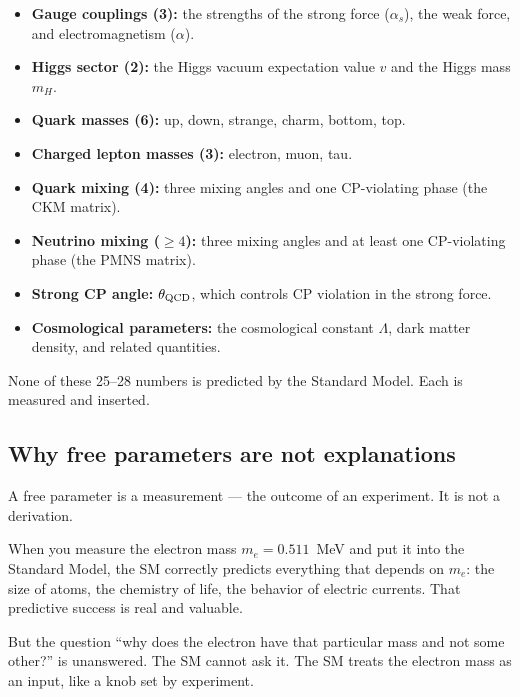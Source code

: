 \documentclass[11pt,a4paper]{article}
\begin{document}
\begin{tcolorbox}[colback=boxorange,colframe=orange!60!black,
  title={The 25 standard model free parameters},breakable]
\begin{itemize}[itemsep=2pt]
  \item \textbf{Gauge couplings (3):} the strengths of the strong force
        ($\alpha_s$), the weak force, and electromagnetism ($\alpha$).
  \item \textbf{Higgs sector (2):} the Higgs vacuum expectation value $v$
        and the Higgs mass $m_H$.
  \item \textbf{Quark masses (6):} up, down, strange, charm, bottom, top.
  \item \textbf{Charged lepton masses (3):} electron, muon, tau.
  \item \textbf{Quark mixing (4):} three mixing angles and one CP-violating phase
        (the CKM matrix).
  \item \textbf{Neutrino mixing ($\geq 4$):} three mixing angles and at least
        one CP-violating phase (the PMNS matrix).
  \item \textbf{Strong CP angle:} $\theta_{\rm QCD}$, which controls CP violation
        in the strong force.
  \item \textbf{Cosmological parameters:} the cosmological constant $\Lambda$,
        dark matter density, and related quantities.
\end{itemize}
None of these 25--28 numbers is predicted by the Standard Model.
Each is measured and inserted.
\end{tcolorbox}

\subsection{Why free parameters are not explanations}

A free parameter is a measurement --- the outcome of an experiment.
It is not a derivation.

When you measure the electron mass $m_e = 0.511$~MeV and put it into
the Standard Model, the SM correctly predicts everything that depends
on $m_e$: the size of atoms, the chemistry of life, the behavior of
electric currents.
That predictive success is real and valuable.

But the question ``why does the electron have that particular mass and not
some other?'' is unanswered.
The SM cannot ask it.
The SM treats the electron mass as an input, like a knob set by experiment.
\end{document}
